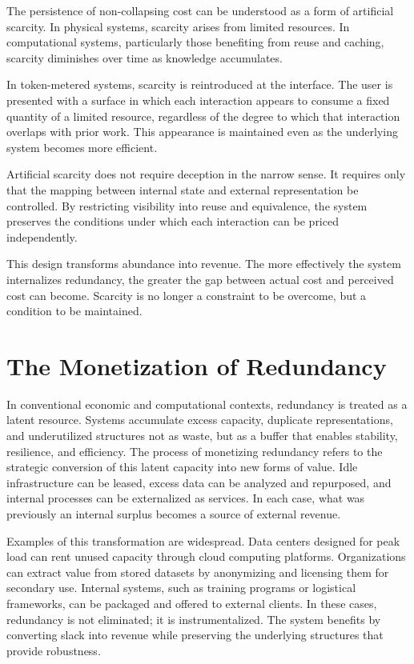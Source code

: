 \documentclass[12pt, oneside]{article}
\begin{document}
The persistence of non-collapsing cost can be understood as a form of artificial scarcity. In physical systems, scarcity arises from limited resources. In computational systems, particularly those benefiting from reuse and caching, scarcity diminishes over time as knowledge accumulates.

In token-metered systems, scarcity is reintroduced at the interface. The user is presented with a surface in which each interaction appears to consume a fixed quantity of a limited resource, regardless of the degree to which that interaction overlaps with prior work. This appearance is maintained even as the underlying system becomes more efficient.

Artificial scarcity does not require deception in the narrow sense. It requires only that the mapping between internal state and external representation be controlled. By restricting visibility into reuse and equivalence, the system preserves the conditions under which each interaction can be priced independently.

This design transforms abundance into revenue. The more effectively the system internalizes redundancy, the greater the gap between actual cost and perceived cost can become. Scarcity is no longer a constraint to be overcome, but a condition to be maintained.

\section{The Monetization of Redundancy}

In conventional economic and computational contexts, redundancy is treated as a latent resource. Systems accumulate excess capacity, duplicate representations, and underutilized structures not as waste, but as a buffer that enables stability, resilience, and efficiency. The process of monetizing redundancy refers to the strategic conversion of this latent capacity into new forms of value. Idle infrastructure can be leased, excess data can be analyzed and repurposed, and internal processes can be externalized as services. In each case, what was previously an internal surplus becomes a source of external revenue.

Examples of this transformation are widespread. Data centers designed for peak load can rent unused capacity through cloud computing platforms. Organizations can extract value from stored datasets by anonymizing and licensing them for secondary use. Internal systems, such as training programs or logistical frameworks, can be packaged and offered to external clients. In these cases, redundancy is not eliminated; it is instrumentalized. The system benefits by converting slack into revenue while preserving the underlying structures that provide robustness.
\end{document}
